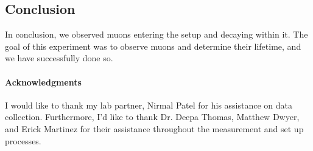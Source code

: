 \documentclass[10pt,letterpaper,onecolumn]{article}
\begin{document}
\subsection{Conclusion}
In conclusion, we observed muons entering the setup and decaying within it. The goal of this experiment was to observe muons and determine their lifetime, and we have successfully done so.
\paragraph*{Acknowledgments}
I would like to thank my lab partner, Nirmal Patel for his assistance on data collection. Furthermore, I'd like to thank Dr. Deepa Thomas, Matthew Dwyer, and Erick Martinez for their assistance throughout the measurement and set up processes. 

\newpage
 
\end{document}
